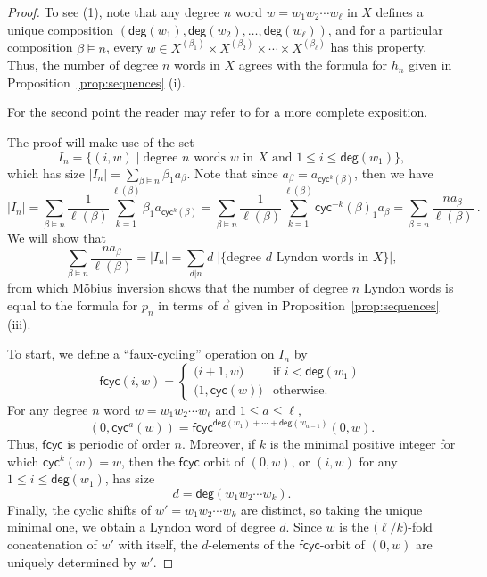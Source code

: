 \documentclass[11pt]{amsart}
\theoremstyle{definition}
\numberwithin{equation}{section}
\begin{document}
\begin{proof}
To see (1), note that any degree $n$ word $w = w_1 w_2 \cdots w_{\ell}$ in $X$
defines a unique composition $(\mathsf{deg}(w_{1}), \mathsf{deg}(w_{2}), \ldots, \mathsf{deg}(w_{\ell}))$,
and for a particular composition $\beta \vDash n$,
every $w \in X^{(\beta_{1})} \times X^{(\beta_{2})} \times \cdots \times X^{(\beta_{\ell})}$ has this property.
Thus, the number of degree $n$ words in $X$ agrees with the formula for $h_{n}$ given in Proposition~\ref{prop:sequences} (i).  

For the second point the reader may refer to \cite[Theorem 4.9, Theorem 5.1]{Reutenauer-FreeLieAlgebras}
for a more complete exposition.

The proof will make use of the set
\[
I_{n} = \{ (i, w) \;|\; \text{degree $n$ words $w$ in $X$ and $1 \le i \le \mathsf{deg}(w_{1})$}\},
\]
which has size
$
|I_{n}| = \sum_{\beta \vDash n} \beta_{1} a_{\beta} .
$
Note that since $a_\beta = a_{\mathsf{cyc}^k(\beta)}$, then we have
\[
|I_{n}|
= \sum_{\beta \vDash n} \frac{1}{\ell(\beta)}
\sum_{k=1}^{\ell(\beta)} \beta_{1} a_{\mathsf{cyc}^{k}(\beta)}
= \sum_{\beta \vDash n} \frac{1}{\ell(\beta)}
\sum_{k=1}^{\ell(\beta)} \mathsf{cyc}^{-k}(\beta)_{1} a_{\beta}
= \sum_{\beta \vDash n} \frac{n a_{\beta}}{\ell(\beta)}~.
\]
We will show that 
\begin{equation}
\label{eq:LyndonMobius}
\sum_{\beta \vDash n} \frac{n a_{\beta}}{\ell(\beta)} = |I_{n}| = \sum_{d | n} d \; |\{\text{degree $d$ Lyndon words in $X$}\}|,
\end{equation}
from which M\"{o}bius inversion shows that the number of degree $n$ Lyndon words is equal to the formula for $p_{n}$ in terms of $\vec{a}$ given in Proposition~\ref{prop:sequences} (iii).

To start, we define a ``faux-cycling'' operation on $I_{n}$ by
\[
\mathsf{fcyc}(i, w) = \begin{cases} 
\big(i+1, w\big) & \text{if $i < \mathsf{deg}(w_{1})$} \\ 
\big(1, \mathsf{cyc}(w)\big) & \text{otherwise}.
\end{cases}
\]
For any degree $n$ word $w = w_{1} w_{2} \cdots w_{\ell}$ and  $1 \le a \le \ell$, 
\[
(0, \mathsf{cyc}^{a}(w)) = \mathsf{fcyc}^{\mathsf{deg}(w_{1}) + \cdots + \mathsf{deg}(w_{a-1})} (0, w).
\]
Thus, $\mathsf{fcyc}$ is periodic of order $n$.  Moreover, if $k$ is the minimal positive integer for which $\mathsf{cyc}^{k}(w) = w$, then the $\mathsf{fcyc}$ orbit of $(0, w)$, or $(i, w)$ for any $1 \le i \le \mathsf{deg}(w_{1})$, has size
\[
d = \mathsf{deg}(w_{1}w_{2}\cdots w_{k}).
\]
Finally, the cyclic shifts of $w' = w_{1}w_{2}\cdots w_{k}$ are distinct, so taking the unique minimal one, we obtain a Lyndon word of degree $d$.  Since $w$ is the $(\ell/k$)-fold concatenation of $w'$ with itself, the $d$-elements of the $\mathsf{fcyc}$-orbit of $(0, w)$ are uniquely determined by $w'$.
\end{proof}
\end{document}
